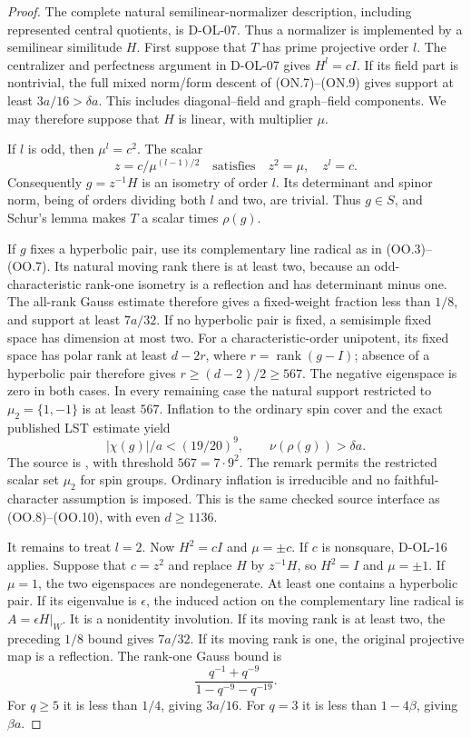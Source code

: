 \begin{proof}
The complete natural semilinear-normalizer description,
including represented central quotients, is D-OL-07.  Thus a
normalizer is implemented by a semilinear similitude $H$.
First suppose that $T$ has prime projective order $l$.  The
centralizer and perfectness argument in D-OL-07 gives $H^l=cI$.
If its field part is nontrivial, the full mixed norm/form descent
of (ON.7)--(ON.9) gives support at least $3a/16>\delta a$.
This includes diagonal--field and graph--field components.
We may therefore suppose that $H$ is linear, with multiplier $\mu$.

If $l$ is odd, then $\mu^l=c^2$.  The scalar
\[
                    z=c/\mu^{(l-1)/2}
                    \quad\text{satisfies}\quad
                    z^2=\mu,\quad z^l=c.
                    \tag{OE.15}
\]
Consequently $g=z^{-1}H$ is an isometry of order $l$.
Its determinant and spinor norm, being of orders dividing both
$l$ and two, are trivial.  Thus $g\in S$, and Schur's lemma
makes $T$ a scalar times $\rho(g)$.

If $g$ fixes a hyperbolic pair, use its complementary line
radical as in (OO.3)--(OO.7).  Its natural moving rank there
is at least two, because an odd-characteristic rank-one
isometry is a reflection and has determinant minus one.
The all-rank Gauss estimate therefore gives a fixed-weight
fraction less than $1/8$, and support at least $7a/32$.
If no hyperbolic pair is fixed, a semisimple fixed space has
dimension at most two.  For a characteristic-order unipotent,
its fixed space has polar rank at least $d-2r$, where
$r=\operatorname{rank}(g-I)$; absence of a hyperbolic pair
therefore gives $r\ge(d-2)/2\ge567$.  The negative eigenspace
is zero in both cases.  In every remaining case the natural
support restricted to $\mu_2=\{1,-1\}$ is at least $567$.
Inflation to the ordinary spin cover and the exact published
LST estimate yield
\[
                    |\chi(g)|/a<(19/20)^9,
                    \qquad\nu(\rho(g))>\delta a.
                    \tag{OE.16}
\]
The source is \cite[Theorem~4.3.6, (4.3.2), pp.~1917--1918;
complete proof pp.~1918--1923; Remark~4.3.7, p.~1923]{HOS:LST2011},
with threshold $567=7\cdot9^2$.  The remark permits the
restricted scalar set $\mu_2$ for spin groups.  Ordinary
inflation is irreducible and no faithful-character assumption
is imposed.  This is the same checked source interface as
(OO.8)--(OO.10), with even $d\ge1136$.

It remains to treat $l=2$.  Now $H^2=cI$ and $\mu=\pm c$.
If $c$ is nonsquare, D-OL-16 applies.  Suppose that $c=z^2$
and replace $H$ by $z^{-1}H$, so $H^2=I$ and $\mu=\pm1$.
If $\mu=1$, the two eigenspaces are nondegenerate.  At least
one contains a hyperbolic pair.  If its eigenvalue is
$\epsilon$, the induced action on the complementary line
radical is $A=\epsilon H|_W$.  It is a nonidentity involution.
If its moving rank is at least two, the preceding $1/8$
bound gives $7a/32$.  If its moving rank is one, the original
projective map is a reflection.  The rank-one Gauss bound is
\[
 \frac{q^{-1}+q^{-9}}{1-q^{-9}-q^{-19}}.
 \tag{OE.17}
\]
For $q\ge5$ it is less than $1/4$, giving $3a/16$.
For $q=3$ it is less than $1-4\beta$, giving $\beta a$.


\end{proof}
